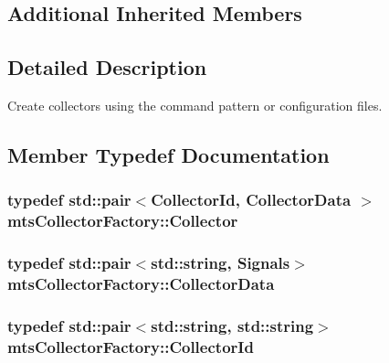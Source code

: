\subsection*{Additional Inherited Members}


\subsection{Detailed Description}
Create collectors using the command pattern or configuration files. 

\subsection{Member Typedef Documentation}
\hypertarget{classmts_collector_factory_abe3e52266409a03bcf7ba68004ee08d2}{
\subsubsection[{Collector}]{\setlength{\rightskip}{0pt plus 5cm}typedef std\-::pair$<${\bf Collector\-Id}, {\bf Collector\-Data} $>$ {\bf mts\-Collector\-Factory\-::\-Collector}\hspace{0.3cm}{\ttfamily [protected]}}}\label{classmts_collector_factory_abe3e52266409a03bcf7ba68004ee08d2}
\hypertarget{classmts_collector_factory_aca25b6c09f469fe168d3fc99ef7aec8d}{
\subsubsection[{Collector\-Data}]{\setlength{\rightskip}{0pt plus 5cm}typedef std\-::pair$<$std\-::string, {\bf Signals}$>$ {\bf mts\-Collector\-Factory\-::\-Collector\-Data}\hspace{0.3cm}{\ttfamily [protected]}}}\label{classmts_collector_factory_aca25b6c09f469fe168d3fc99ef7aec8d}
\hypertarget{classmts_collector_factory_adaeb0ec5b7392f2a011eb478334e86b6}{
\subsubsection[{Collector\-Id}]{\setlength{\rightskip}{0pt plus 5cm}typedef std\-::pair$<$std\-::string, std\-::string$>$ {\bf mts\-Collector\-Factory\-::\-Collector\-Id}\hspace{0.3cm}{\ttfamily [protected]}}}\label{classmts_collector_factory_adaeb0ec5b7392f2a011eb478334e86b6}
